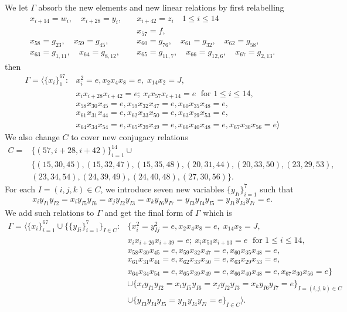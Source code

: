 \documentclass[11pt,letterpaper]{article}
\newcommand{\1}{\mathbb{1}}
\theoremstyle{definition}
\begin{document}
We let $\Gamma$ absorb the new elements and new linear relations by first relabelling
\begin{align*}
	x_{i+14} = w_i, \quad x_{i+28} = y_i,\quad &x_{i+42} = z_i\quad 1 \leq i \leq 14\\
	&x_{57} = f,\\
	x_{58} = g_{23},\quad x_{59} = g_{45},\quad &x_{60} = g_{76},\quad x_{61} = g_{32},\quad x_{62} = g_{58},\\
	x_{63} = g_{1,11},\quad x_{64} =g_{8,12},\quad &x_{65} = g_{11,7},\quad x_{66} =g_{12,6},\quad x_{67} = g_{2,13}.
\end{align*}
then
\begin{align*}
	\Gamma = \langle \{x_i\}_1^{67} :&x_i^2 = e, x_2x_4x_8 = e,\; x_{14}x_{2} = J,\\
	&x_ix_{i+28}x_{i+42} =e;\ x_ix_{57}x_{i+14} =e\;\text{ for } 1 \leq i \leq 14,\\
	&x_{58}x_{30}x_{45} = e,
	x_{59}x_{32}x_{47} = e,
	x_{60}x_{35}x_{48} = e,\\
	&x_{61}x_{31}x_{44} = e,
	x_{62}x_{33}x_{50} = e,
	x_{63}x_{29}x_{53} = e,\\
	&x_{64}x_{34}x_{54} = e,
	x_{65}x_{39}x_{49} = e,
	x_{66}x_{40}x_{48} = e,
	x_{67}x_{30}x_{56} = e\rangle
\end{align*}
We also change $C$ to cover new conjugacy relations
\begin{align*}
	C = &\{(57, i+28, i+42)\}_{i=1}^{14} \cup\\
	 &\{(15,30,45),(15,32,47),(15,35,48),(20,31,44),(20,33,50),(23,29,53),\\
	 &(23, 34, 54),(24,39,49),(24,40,48),(27,30,56)\}.
\end{align*}
For each $I = (i,j,k) \in C$, we introduce seven new variables $\{y_{Ii}\}_{i=1}^7$ such that 
\begin{align*}
	x_iy_{I1}y_{I2} = x_iy_{I5}y_{I6} =x_jy_{I2}y_{I3}=x_ky_{I6}y_{I7}=y_{I3}y_{I4}y_{I5}=y_{I1}y_{I4}y_{I7}=e.
\end{align*}
We add such relations to $\Gamma$ and get the final form of $\Gamma$ which is
\begin{equation}
	\begin{split}
	\Gamma = \langle \{x_i\}_{i=1}^{67}\cup\{\{y_{Ii}\}_{i=1}^7\}_{I \in C} :&\{x_i^2 = y_{Ij}^2=e, x_2x_4x_8 = e,\; x_{14}x_{2} = J,\\
	&x_ix_{i+26}x_{i+39} =e;\ x_ix_{53}x_{i+13} =e\;\text{ for } 1 \leq i \leq 14,\\
	&x_{58}x_{30}x_{45} = e,
	x_{59}x_{32}x_{47} = e,
	x_{60}x_{35}x_{48} = e,\\
	&x_{61}x_{31}x_{44} = e,
	x_{62}x_{33}x_{50} = e,
	x_{63}x_{29}x_{53} = e,\\
	&x_{64}x_{34}x_{54} = e,
	x_{65}x_{39}x_{49} = e,
	x_{66}x_{40}x_{48} = e,
	x_{67}x_{30}x_{56} = e\}\\
	&\cup \{x_iy_{I1}y_{I2} = x_iy_{I5}y_{I6} =x_jy_{I2}y_{I3}=x_ky_{I6}y_{I7}=e\}_{I=(i,j,k) \in C} \\
	&\cup \{y_{I3}y_{I4}y_{I5}=y_{I1}y_{I4}y_{I7} =e\}_{I \in C}\rangle.
	\end{split}
\end{equation}
\end{document}
